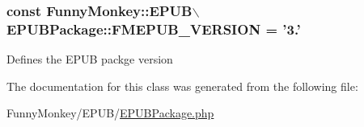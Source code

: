 \hypertarget{classFunnyMonkey_1_1EPUB_1_1EPUBPackage_adf5ddbba67ec2bfd0ac973c4c085d53f}{
\subsubsection[{\-F\-M\-E\-P\-U\-B\-\_\-\-V\-E\-R\-S\-I\-O\-N}]{\setlength{\rightskip}{0pt plus 5cm}const \-Funny\-Monkey\-::\-E\-P\-U\-B$\backslash${\bf \-E\-P\-U\-B\-Package\-::\-F\-M\-E\-P\-U\-B\-\_\-\-V\-E\-R\-S\-I\-O\-N} = '3.'}}\label{classFunnyMonkey_1_1EPUB_1_1EPUBPackage_adf5ddbba67ec2bfd0ac973c4c085d53f}
\-Defines the \-E\-P\-U\-B packge version 

\-The documentation for this class was generated from the following file\-:\begin{DoxyCompactItemize}
\item 
\-Funny\-Monkey/\-E\-P\-U\-B/\hyperlink{EPUBPackage_8php}{\-E\-P\-U\-B\-Package.\-php}\end{DoxyCompactItemize}
